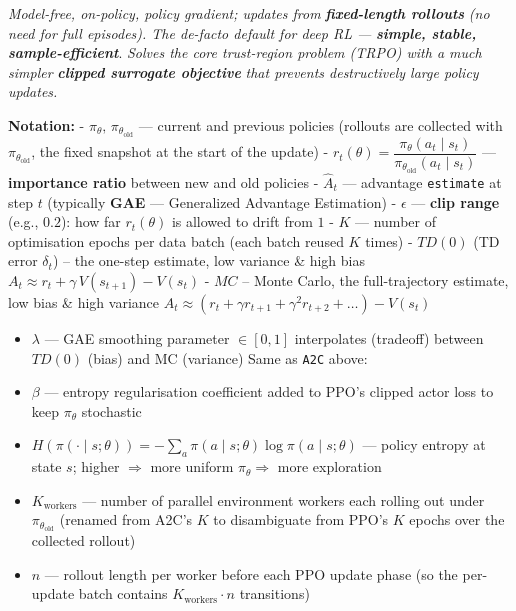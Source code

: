 \documentclass[11pt]{article}
\providecommand{\tightlist}{%
      \setlength{\itemsep}{0pt}\setlength{\parskip}{0pt}}
\begin{document}
    \emph{Model-free, on-policy, policy gradient; updates from}
\textbf{\emph{fixed-length rollouts}} \emph{(no need for full episodes).
The de-facto default for deep RL ---} \textbf{\emph{simple, stable,
sample-efficient}}. \emph{Solves the core trust-region problem (TRPO)
with a much simpler} \textbf{\emph{clipped surrogate objective}}
\emph{that prevents destructively large policy updates.}

    \textbf{Notation:} - \(\pi_\theta,\,\pi_{\theta_\text{old}}\) ---
current and previous policies (rollouts are collected with
\(\pi_{\theta_\text{old}}\), the fixed snapshot at the start of the
update) -
\(r_t(\theta) = \dfrac{\pi_\theta(a_t \mid s_t)}{\pi_{\theta_\text{old}}(a_t \mid s_t)}\)
--- \textbf{importance ratio} between new and old policies -
\(\hat{A}_t\) --- advantage \texttt{estimate} at step \(t\) (typically
\textbf{GAE} --- Generalized Advantage Estimation) - \(\epsilon\) ---
\textbf{clip range} (e.g., \(0.2\)): how far \(r_t(\theta)\) is allowed
to drift from \(1\) - \(K\) --- number of optimisation epochs per data
batch (each batch reused \(K\) times) - \(TD(0)\) (TD error
\(\delta_t\)) -- the one-step estimate, low variance \& high bias
\(A_t \approx r_t + \gamma\,V(s_{t+1}) - V(s_t)\) - \(MC\) -- Monte
Carlo, the full-trajectory estimate, low bias \& high variance
\(A_t \approx \left( r_t + \gamma r_{t+1} + \gamma^2 r_{t+2} + \dots \right) - V(s_t)\)

\begin{itemize}
\tightlist
\item
  \(\lambda\) --- GAE smoothing parameter \(\in[0,1]\) interpolates
  (tradeoff) between \(TD(0)\) (bias) and MC (variance) Same as
  \texttt{A2C} above:
\item
  \(\beta\) --- entropy regularisation coefficient added to PPO's
  clipped actor loss to keep \(\pi_\theta\) stochastic
\item
  \(H(\pi(\cdot\mid s;\theta)) = -\sum_a \pi(a\mid s;\theta)\log\pi(a\mid s;\theta)\)
  --- policy entropy at state \(s\); higher \(\Rightarrow\) more uniform
  \(\pi_\theta \Rightarrow\) more exploration
\item
  \(K_\text{workers}\) --- number of parallel environment workers each
  rolling out under \(\pi_{\theta_\text{old}}\) (renamed from A2C's
  \(K\) to disambiguate from PPO's \(K\) epochs over the collected
  rollout)
\item
  \(n\) --- rollout length per worker before each PPO update phase (so
  the per-update batch contains \(K_\text{workers}\cdot n\) transitions)
\end{itemize}
\end{document}
